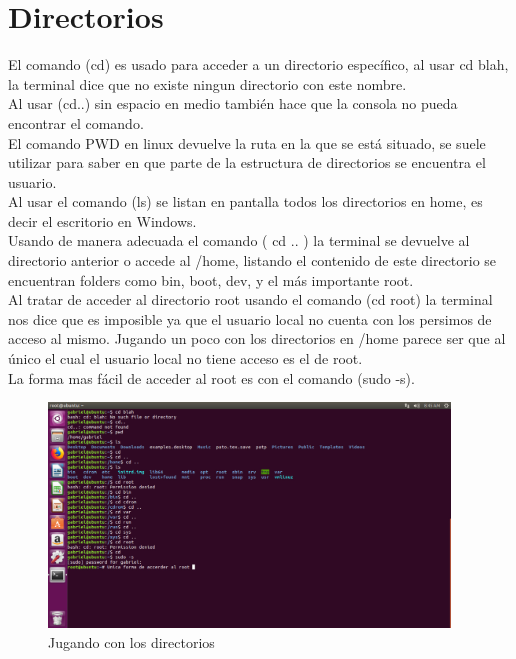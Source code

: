 \documentclass[
  letterpaper, 
  maincolor=black,
  sectioncolor=black!90,
  subsectioncolor=black!70,
  itemtextcolor=black!40,
]{fortysecondscv}
\begin{document}
\section{Directorios}
    El comando (cd) es usado para acceder a un directorio específico, al usar cd blah, la terminal dice que no existe ningun directorio con este nombre. \\
    Al usar (cd..) sin espacio en medio también hace que la consola no pueda encontrar el comando.\\
    El comando PWD en linux devuelve la ruta en la que se está situado, se suele utilizar para saber en que parte de la estructura de directorios se encuentra el usuario.\\
    Al usar el comando (ls) se listan en pantalla todos los directorios en home, es decir el escritorio en Windows.\\
    Usando de manera adecuada el comando ( cd .. ) la terminal se devuelve al directorio anterior o accede al /home, listando el contenido de este directorio se encuentran folders como bin, boot, dev, y el más importante root.\\ 
    Al tratar de acceder al directorio root usando el comando (cd root) la terminal nos dice que es imposible ya que el usuario local no cuenta con los persimos de acceso al mismo. Jugando un poco con los directorios en /home parece ser que al único el cual el usuario local no tiene acceso es el de root.\\
    La forma mas fácil de acceder al root es con el comando (sudo -s).
    \begin{figure}[H]
        \centering
        \includegraphics[trim= 0 175 230 0,clip,width=0.95\textwidth]{img/directorios.jpg}
        \caption{Jugando con los directorios}
        \label{fig:my_label}
    \end{figure}
\end{document}
